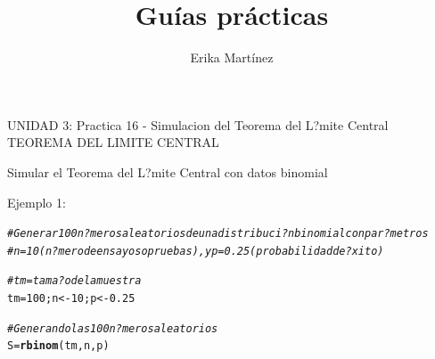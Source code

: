 \documentclass[10pt,a4paper]{article}\usepackage[]{graphicx}\usepackage[]{color}
\author{Erika Martínez}
\title{Guías prácticas}
\makeatletter
\newcommand{\hlnum}[1]{\textcolor[rgb]{0.686,0.059,0.569}{#1}}%
\newcommand{\hlcom}[1]{\textcolor[rgb]{0.678,0.584,0.686}{\textit{#1}}}%
\newcommand{\hlstd}[1]{\textcolor[rgb]{0.345,0.345,0.345}{#1}}%
\newcommand{\hlkwb}[1]{\textcolor[rgb]{0.69,0.353,0.396}{#1}}%
\newcommand{\hlkwd}[1]{\textcolor[rgb]{0.737,0.353,0.396}{\textbf{#1}}}%
\newenvironment{kframe}{%
 \def\at@end@of@kframe{}%
 \ifinner\ifhmode%
  \def\at@end@of@kframe{\end{minipage}}%
  \begin{minipage}{\columnwidth}%
 \fi\fi%
 \def\FrameCommand##1{\hskip\@totalleftmargin \hskip-\fboxsep
 \colorbox{shadecolor}{##1}\hskip-\fboxsep
     \hskip-\linewidth \hskip-\@totalleftmargin \hskip\columnwidth}%
 \MakeFramed {\advance\hsize-\width
   \@totalleftmargin\z@ \linewidth\hsize
   \@setminipage}}%
 {\par\unskip\endMakeFramed%
 \at@end@of@kframe}
\newenvironment{knitrout}{}{} %
\makeatother
\begin{document}
\maketitle
\newpage


UNIDAD 3: Practica 16 - Simulacion del Teorema del L?mite Central 
TEOREMA DEL LIMITE CENTRAL

Simular el Teorema del L?mite Central con datos binomial

Ejemplo 1:
\begin{knitrout}
\color{fgcolor}\begin{kframe}
\begin{alltt}
\hlcom{#Generar 100 n?meros aleatorios de una distribuci?n binomial con par?metros }
\hlcom{#n=10 (n?mero de ensayos o pruebas), y p=0.25 (probabilidad de ?xito) }

\hlcom{# tm= tama?o de la muestra }
\hlstd{tm}\hlkwb{=}\hlnum{100}\hlstd{; n} \hlkwb{<-} \hlnum{10}\hlstd{; p} \hlkwb{<-} \hlnum{0.25}

\hlcom{#Generando las 100 n?meros aleatorios }
\hlstd{S} \hlkwb{=} \hlkwd{rbinom}\hlstd{(tm, n, p)}


\end{alltt}
\end{kframe}
\end{knitrout}
\end{document}
